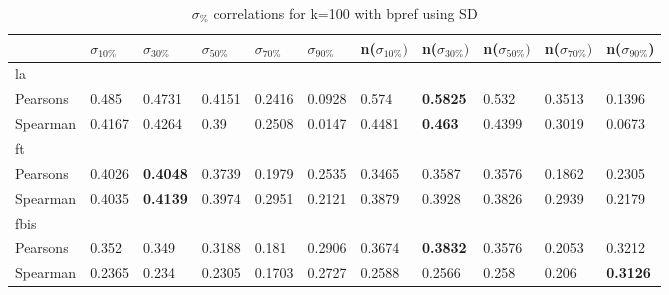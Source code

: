 \documentclass{sig-alternate}
\begin{document}
\begin{table}[h!]
\centering
\begin{tabular}{|l||l|l|l|l|l||l|l|l|l|l|}
\hline
& $\sigma_{10\%}$ & $\sigma_{30\%}$ & $\sigma_{50\%}$ & $\sigma_{70\%}$ & $\sigma_{90\%}$ & n($\sigma_{10\%})$ & n($\sigma_{30\%})$ & n($\sigma_{50\%})$ & n($\sigma_{70\%})$ & n($\sigma_{90\%}$) \\ \hline
\hline la &  &  &  &  &  &  &  &  &  &  \\ \hline
Pearsons & 0.485 & 0.4731 & 0.4151 & 0.2416 & 0.0928 & 0.574 & \textbf{0.5825} & 0.532 & 0.3513 & 0.1396 \\ \hline
Spearman & 0.4167 & 0.4264 & 0.39 & 0.2508 & 0.0147 & 0.4481 & \textbf{0.463} & 0.4399 & 0.3019 & 0.0673 \\ \hline
\hline ft &  &  &  &  &  &  &  &  &  &  \\ \hline
Pearsons & 0.4026 & \textbf{0.4048} & 0.3739 & 0.1979 & 0.2535 & 0.3465 & 0.3587 & 0.3576 & 0.1862 & 0.2305 \\ \hline
Spearman & 0.4035 & \textbf{0.4139} & 0.3974 & 0.2951 & 0.2121 & 0.3879 & 0.3928 & 0.3826 & 0.2939 & 0.2179 \\ \hline
\hline fbis &  &  &  &  &  &  &  &  &  &  \\ \hline
Pearsons & 0.352 & 0.349 & 0.3188 & 0.181 & 0.2906 & 0.3674 & \textbf{0.3832} & 0.3576 & 0.2053 & 0.3212 \\ \hline
Spearman & 0.2365 & 0.234 & 0.2305 & 0.1703 & 0.2727 & 0.2588 & 0.2566 & 0.258 & 0.206 & \textbf{0.3126} \\ \hline
\end{tabular}
\caption{$\sigma_{\%}$ correlations for k=100 with bpref using SD}
\end{table}
\end{document}
